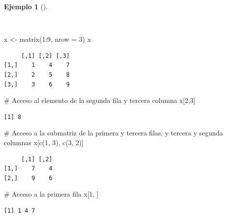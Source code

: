 \documentclass[
  spanish,
  a4paper,
]{scrreport}
\newenvironment{Shaded}{\begin{snugshade}}{\end{snugshade}}
\newcommand{\AttributeTok}[1]{\textcolor[rgb]{0.40,0.45,0.13}{#1}}
\newcommand{\CommentTok}[1]{\textcolor[rgb]{0.37,0.37,0.37}{#1}}
\newcommand{\DecValTok}[1]{\textcolor[rgb]{0.68,0.00,0.00}{#1}}
\newcommand{\FunctionTok}[1]{\textcolor[rgb]{0.28,0.35,0.67}{#1}}
\newcommand{\NormalTok}[1]{\textcolor[rgb]{0.00,0.23,0.31}{#1}}
\newcommand{\OtherTok}[1]{\textcolor[rgb]{0.00,0.23,0.31}{#1}}
\newcommand{\SpecialCharTok}[1]{\textcolor[rgb]{0.37,0.37,0.37}{#1}}
\theoremstyle{definition}
\theoremstyle{definition}
\newtheorem{example}{Ejemplo}[chapter]
\theoremstyle{remark}
\begin{document}
\begin{example}[]\protect\hypertarget{exm-acceso-matriz}{}\label{exm-acceso-matriz}

~

\begin{Shaded}
\begin{Highlighting}[]
\NormalTok{x }\OtherTok{\textless{}{-}} \FunctionTok{matrix}\NormalTok{(}\DecValTok{1}\SpecialCharTok{:}\DecValTok{9}\NormalTok{, }\AttributeTok{nrow =} \DecValTok{3}\NormalTok{)}
\NormalTok{x}
\end{Highlighting}
\end{Shaded}

\begin{verbatim}
     [,1] [,2] [,3]
[1,]    1    4    7
[2,]    2    5    8
[3,]    3    6    9
\end{verbatim}

\begin{Shaded}
\begin{Highlighting}[]
\CommentTok{\# Acceso al elemento de la segunda fila y tercera columna}
\NormalTok{x[}\DecValTok{2}\NormalTok{,}\DecValTok{3}\NormalTok{]}
\end{Highlighting}
\end{Shaded}

\begin{verbatim}
[1] 8
\end{verbatim}

\begin{Shaded}
\begin{Highlighting}[]
\CommentTok{\# Acceso a la submatriz de la primera y tercera filas, y tercera y segunda columnas}
\NormalTok{x[}\FunctionTok{c}\NormalTok{(}\DecValTok{1}\NormalTok{, }\DecValTok{3}\NormalTok{), }\FunctionTok{c}\NormalTok{(}\DecValTok{3}\NormalTok{, }\DecValTok{2}\NormalTok{)]}
\end{Highlighting}
\end{Shaded}

\begin{verbatim}
     [,1] [,2]
[1,]    7    4
[2,]    9    6
\end{verbatim}

\begin{Shaded}
\begin{Highlighting}[]
\CommentTok{\# Acceso a la primera fila}
\NormalTok{x[}\DecValTok{1}\NormalTok{, ]}
\end{Highlighting}
\end{Shaded}

\begin{verbatim}
[1] 1 4 7
\end{verbatim}


\end{example}
\end{document}
